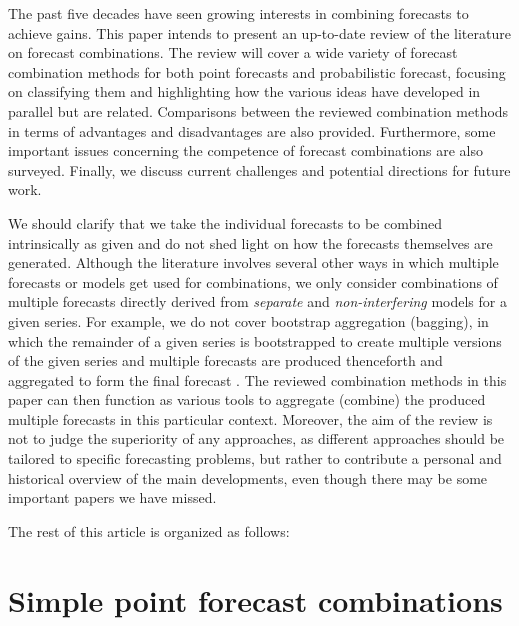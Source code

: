 \documentclass[11pt]{article}
\begin{document}
The past five decades have seen growing interests in combining forecasts to achieve gains. This paper intends to present an up-to-date review of the literature on forecast combinations. The review will cover a wide variety of forecast combination methods for both point forecasts and probabilistic forecast, focusing on classifying them and highlighting how the various ideas have developed in parallel but are related. Comparisons between the reviewed combination methods in terms of advantages and disadvantages are also provided. Furthermore, some important issues concerning the competence of forecast combinations are also surveyed. Finally, we discuss current challenges and potential directions for future work.

We should clarify that we take the individual forecasts to be combined intrinsically as given and do not shed light on how the forecasts themselves are generated. Although the literature involves several other ways in which multiple forecasts or models get used for combinations, we only consider combinations of multiple forecasts directly derived from \textit{separate} and \textit{non-interfering} models for a given series. For example, we do not cover bootstrap aggregation (bagging), in which the remainder of a given series is bootstrapped to create multiple versions of the given series and multiple forecasts are produced thenceforth and aggregated to form the final forecast \citep[see, for example,][]{Bergmeir2016-ae,Petropoulos2018-fw}. The reviewed combination methods in this paper can then function as various tools to aggregate (combine) the produced multiple forecasts in this particular context. Moreover, the aim of the review is not to judge the superiority of any approaches, as different approaches should be tailored to specific forecasting problems, but rather to contribute a personal and historical overview of the main developments, even though there may be some important papers we have missed.

The rest of this article is organized as follows:



\section{Simple point forecast combinations}
\label{sec:simple_combinations}
\end{document}
